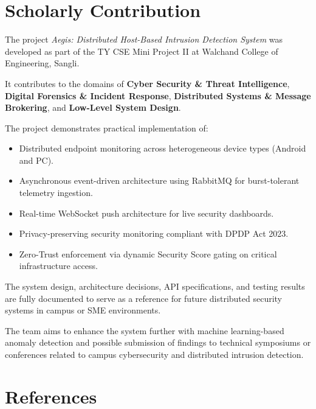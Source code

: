 \documentclass[12pt,a4paper]{report}
\begin{document}
\chapter{Scholarly Contribution}

The project \textit{Aegis: Distributed Host-Based Intrusion Detection System} was developed as part of the TY CSE Mini Project II at Walchand College of Engineering, Sangli.

It contributes to the domains of \textbf{Cyber Security \& Threat Intelligence}, \textbf{Digital Forensics \& Incident Response}, \textbf{Distributed Systems \& Message Brokering}, and \textbf{Low-Level System Design}.

The project demonstrates practical implementation of:
\begin{itemize}[leftmargin=*, noitemsep]
  \item Distributed endpoint monitoring across heterogeneous device types (Android and PC).
  \item Asynchronous event-driven architecture using RabbitMQ for burst-tolerant telemetry ingestion.
  \item Real-time WebSocket push architecture for live security dashboards.
  \item Privacy-preserving security monitoring compliant with DPDP Act 2023.
  \item Zero-Trust enforcement via dynamic Security Score gating on critical infrastructure access.
\end{itemize}

The system design, architecture decisions, API specifications, and testing results are fully documented to serve as a reference for future distributed security systems in campus or SME environments.

The team aims to enhance the system further with machine learning-based anomaly detection and possible submission of findings to technical symposiums or conferences related to campus cybersecurity and distributed intrusion detection.

\chapter*{References}
\end{document}
